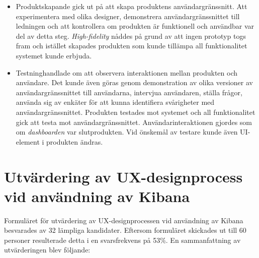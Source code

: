 \documentclass[12pt]{kththesis}
\begin{document}
\begin{itemize}
\item Produktskapande gick ut på att skapa produktens användargränssnitt. Att experimentera med olika designer, demonstrera användargränssnittet till ledningen och att kontrollera om produkten är funktionell och användbar var del av detta steg. \textit{High-fidelity} nåddes på grund av att ingen prototyp togs fram och istället skapades produkten som kunde tillämpa all funktionalitet systemet kunde erbjuda.
\item Testninghandlade om att observera interaktionen mellan produkten och användare. Det kunde även göras genom demonstration av olika versioner av användargränssnittet till användarna, intervjua användaren, ställa frågor, använda sig av enkäter för att kunna identifiera svårigheter med användargränssnittet. Produkten testades mot systemet och all funktionalitet gick att testa mot användargränssnittet. Användarinteraktionen gjordes som om \textit{dashboarden} var slutprodukten. Vid önskemål av testare kunde även UI-element i produkten ändras. 
\end{itemize}

\section{Utvärdering av UX-designprocess vid användning av Kibana}
Formuläret för utvärdering av UX-designprocessen vid användning av Kibana besvarades av 32 lämpliga kandidater. Eftersom formuläret skickades ut till 60 personer resulterade detta i en svarsfrekvens på 53\%. En sammanfattning av utvärderingen blev följande:
\end{document}
